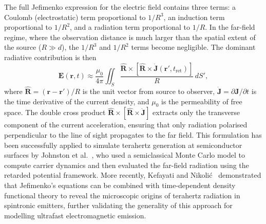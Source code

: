 \documentclass[12pt]{interim_report}
\begin{document}
The full Jefimenko expression for the electric field contains three terms: a Coulomb (electrostatic) term proportional to $1/R^3$, an induction term proportional to $1/R^2$, and a radiation term proportional to $1/R$. In the far-field regime, where the observation distance is much larger than the spatial extent of the source ($R \gg d$), the $1/R^3$ and $1/R^2$ terms become negligible. The dominant radiative contribution is then
\begin{equation}
    \mathbf{E}(\mathbf{r}, t) \approx \frac{\mu_0}{4\pi} \iint_{S} \frac{\hat{\mathbf{R}} \times \left[\hat{\mathbf{R}} \times \dot{\mathbf{J}}(\mathbf{r}', t_{\mathrm{ret}})\right]}{R} \, dS',
    \label{eq:farfield}
\end{equation}
where $\hat{\mathbf{R}} = (\mathbf{r} - \mathbf{r}')/R$ is the unit vector from source to observer, $\dot{\mathbf{J}} = \partial \mathbf{J}/\partial t$ is the time derivative of the current density, and $\mu_0$ is the permeability of free space. The double cross product $\hat{\mathbf{R}} \times [\hat{\mathbf{R}} \times \dot{\mathbf{J}}]$ extracts only the transverse component of the current acceleration, ensuring that only radiation polarised perpendicular to the line of sight propagates to the far field. This formulation has been successfully applied to simulate terahertz generation at semiconductor surfaces by Johnston et al.~\cite{SimulationTHz}, who used a semiclassical Monte Carlo model to compute carrier dynamics and then evaluated the far-field radiation using the retarded potential framework. More recently, Kefayati and Nikoli\'{c}~\cite{Kefayati2024} demonstrated that Jefimenko's equations can be combined with time-dependent density functional theory to reveal the microscopic origins of terahertz radiation in spintronic emitters, further validating the generality of this approach for modelling ultrafast electromagnetic emission.
\end{document}
